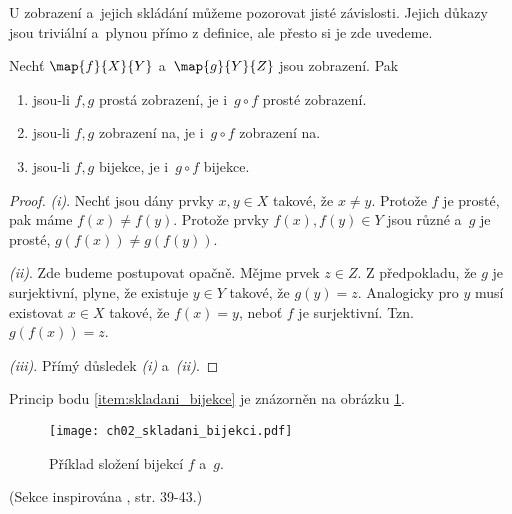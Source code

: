 U zobrazení a~jejich skládání můžeme pozorovat jisté závislosti. Jejich důkazy jsou triviální a~plynou přímo z definice, ale přesto si je zde uvedeme.
\begin{proposition}\label{prop:vlastnosti_skladani_zobrazeni}
    Nechť $\map{f}{X}{Y}$ a~$\map{g}{Y}{Z}$ jsou zobrazení. Pak
    \begin{enumerate}[label=(\roman*)]
        \item\label{item:skladani_injekce} jsou-li $f,g$ prostá zobrazení, je i~$g\circ f$ prosté zobrazení.
        \item\label{item:skladani_surjekce} jsou-li $f,g$ zobrazení na, je i~$g\circ f$ zobrazení na.
        \item\label{item:skladani_bijekce} jsou-li $f,g$ bijekce, je i~$g\circ f$ bijekce.
    \end{enumerate}
\end{proposition}
\begin{proof}
    \textit{(i)}. Nechť jsou dány prvky $x,y\in X$ takové, že $x\neq y$. Protože $f$ je prosté, pak máme $f(x)\neq f(y)$. Protože prvky $f(x),f(y)\in Y$ jsou různé a~$g$ je prosté, $g(f(x))\neq g(f(y))$.\par
    \textit{(ii)}. Zde budeme postupovat opačně. Mějme prvek $z\in Z$. Z předpokladu, že $g$ je surjektivní, plyne, že existuje $y\in Y$ takové, že $g(y)=z$. Analogicky pro $y$ musí existovat $x\in X$ takové, že $f(x)=y$, neboť $f$ je surjektivní. Tzn. $g(f(x))=z$.\par
    \textit{(iii)}. Přímý důsledek \textit{(i)} a~\textit{(ii)}.
\end{proof}
Princip bodu \ref{item:skladani_bijekce} je znázorněn na obrázku \ref{fig:skladani_bijekci}.
\begin{figure}[H]
    \centering
    \texttt{[image: ch02\_skladani\_bijekci.pdf]}
    \caption{Příklad složení bijekcí $f$ a~$g$.}
    \label{fig:skladani_bijekci}
\end{figure}
(Sekce inspirována \cite{MatousekNesetril2009}, str. 39-43.)